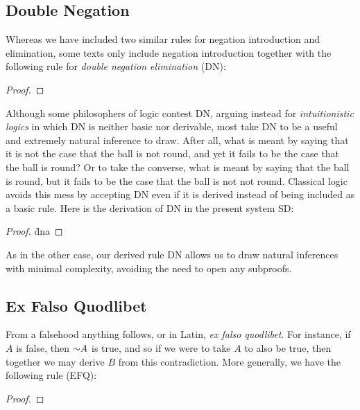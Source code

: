 \subsection{Double Negation}

Whereas we have included two similar rules for negation introduction and elimination, some texts only include negation introduction together with the following rule for \textit{double negation elimination} (DN):

\begin{proof}
\end{proof}

Although some philosophers of logic contest DN, arguing instead for \textit{intuitionistic logics} in which DN is neither basic nor derivable, most take DN to be a useful and extremely natural inference to draw.
After all, what is meant by saying that it is not the case that the ball is not round, and yet it fails to be the case that the ball is round?
Or to take the converse, what is meant by saying that the ball is round, but it fails to be the case that the ball is not not round.
Classical logic avoids this mess by accepting DN even if it is derived instead of being included as a basic rule.
Here is the derivation of DN in the present system SD:

\begin{proof}
  \open 
     \as{}
     \r{dna}
  \close
   
\end{proof}

As in the other case, our derived rule DN allows us to draw natural inferences with minimal complexity, avoiding the need to open any subproofs.




\subsection{Ex Falso Quodlibet}

From a falsehood anything follows, or in Latin, \textit{ex falso quodlibet}.
For instance, if $A$ is false, then $\enot A$ is true, and so if we were to take $A$ to also be true, then together we may derive $B$ from this contradiction. 
More generally, we have the following rule (EFQ):

\begin{proof}
\end{proof}

